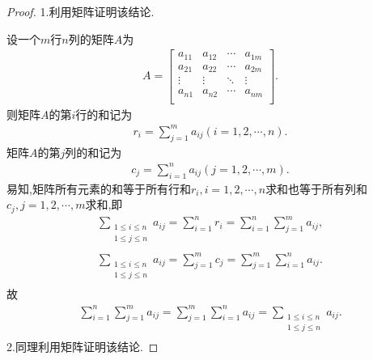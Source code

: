 \documentclass[../../main.tex]{subfiles}%
\begin{document}
\begin{proof}

1.利用矩阵证明该结论.

设一个$m$行$n$列的矩阵$A$为
\begin{align*}
A=\left[ \begin{matrix}
a_{11}&		a_{12}&		\cdots&		a_{1m}\\
a_{21}&		a_{22}&		\cdots&		a_{2m}\\
\vdots&		\vdots&		\ddots&		\vdots\\
a_{n1}&		a_{n2}&		\cdots&		a_{nm}\\
\end{matrix} \right] .
\nonumber
\end{align*}
则矩阵$A$的第$i$行的和记为
\begin{align*}
r_i=\sum\limits_{j=1}^m{a_{ij}}\left( i=1,2,\cdots ,n \right) .
\nonumber
\end{align*}
矩阵$A$的第$j$列的和记为
\begin{align*}
c_j=\sum\limits_{i=1}^n{a_{ij}}\left( j=1,2,\cdots ,m \right) .
\nonumber
\end{align*}
易知,矩阵所有元素的和等于所有行和$r_i,i=1,2,\cdots,n$求和也等于所有列和$c_j,j=1,2,\cdots,m$求和,即
\begin{align*}
\sum\limits_{\substack{1\leqslant i\leqslant n\\1\leqslant j\leqslant n\\}}a_{ij}=\sum\limits_{i=1}^n{r_i}=\sum\limits_{i=1}^n{\sum\limits_{j=1}^m{a_{ij}}},
\\
\sum\limits_{\substack{1\leqslant i\leqslant n\\1\leqslant j\leqslant n\\}}a_{ij}=\sum\limits_{j=1}^m{c_j}=\sum\limits_{j=1}^m{\sum\limits_{i=1}^n{a_{ij}}}.
\nonumber
\end{align*}
故\begin{align*}
\sum\limits_{i=1}^n{\sum\limits_{j=1}^m{a_{ij}}}=\sum\limits_{j=1}^m{\sum\limits_{i=1}^n{a_{ij}}}=\sum\limits_{\substack{1\leqslant i\leqslant n\\1\leqslant j\leqslant n\\}}a_{ij}.
\nonumber
\end{align*}
2.同理利用矩阵证明该结论.


\end{proof}
\end{document}
